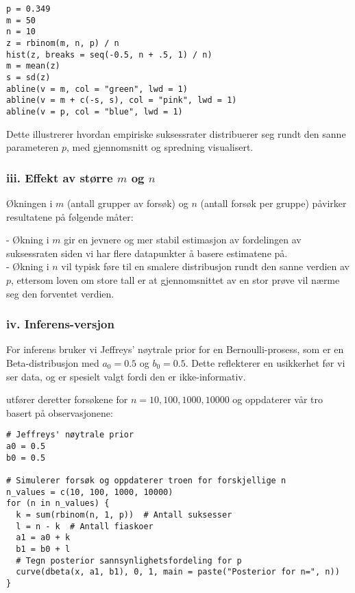 \documentclass{article}
\begin{document}
\begin{verbatim}
p = 0.349
m = 50
n = 10
z = rbinom(m, n, p) / n
hist(z, breaks = seq(-0.5, n + .5, 1) / n)
m = mean(z)
s = sd(z)
abline(v = m, col = "green", lwd = 1)
abline(v = m + c(-s, s), col = "pink", lwd = 1)
abline(v = p, col = "blue", lwd = 1)
\end{verbatim}

Dette illustrerer hvordan empiriske suksessrater distribuerer seg rundt den sanne parameteren \(p\), med gjennomsnitt og spredning visualisert.

\subsubsection*{iii. Effekt av større \(m\) og \(n\)}

Økningen i \(m\) (antall grupper av forsøk) og \(n\) (antall forsøk per gruppe) påvirker resultatene på følgende måter:

- Økning i \(m\) gir en jevnere og mer stabil estimasjon av fordelingen av suksessraten siden vi har flere datapunkter å basere estimatene på.\\
- Økning i \(n\) vil typisk føre til en smalere distribusjon rundt den sanne verdien av \(p\), ettersom loven om store tall er at gjennomsnittet av en stor prøve vil nærme seg den forventet verdien.

\subsubsection*{iv. Inferens-versjon}

For inferens bruker vi Jeffreys' nøytrale prior for en Bernoulli-prosess, som er en Beta-distribusjon med \(a_0 = 0.5\) og \(b_0 = 0.5\). Dette reflekterer en usikkerhet før vi ser data, og er spesielt valgt fordi den er ikke-informativ.

utfører deretter forsøkene for \(n = 10, 100, 1000, 10000\) og oppdaterer vår tro basert på observasjonene:

\begin{verbatim}
# Jeffreys' nøytrale prior
a0 = 0.5
b0 = 0.5

# Simulerer forsøk og oppdaterer troen for forskjellige n
n_values = c(10, 100, 1000, 10000)
for (n in n_values) {
  k = sum(rbinom(n, 1, p))  # Antall suksesser
  l = n - k  # Antall fiaskoer
  a1 = a0 + k
  b1 = b0 + l
  # Tegn posterior sannsynlighetsfordeling for p
  curve(dbeta(x, a1, b1), 0, 1, main = paste("Posterior for n=", n))
}
\end{verbatim}
\end{document}
